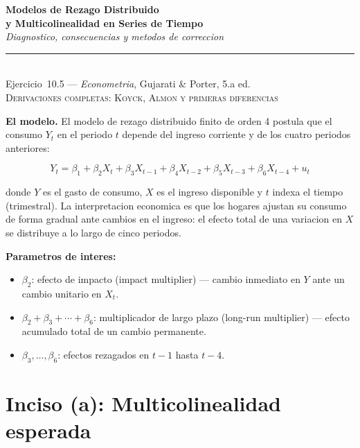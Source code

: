 \documentclass[12pt, letterpaper]{article}
\theoremstyle{remark}
\begin{document}
\begin{center}
  {\LARGE\bfseries Modelos de Rezago Distribuido}\\[6pt]
  {\LARGE\bfseries y Multicolinealidad en Series de Tiempo}\\[12pt]
  {\large\itshape Diagnostico, consecuencias y metodos de correccion}\\[14pt]
  \rule{0.55\linewidth}{0.6pt}\\[8pt]
  {\normalsize Ejercicio~10.5 --- \textit{Econometria}, Gujarati \& Porter, 5.a ed.}\\[4pt]
  {\small\textsc{Derivaciones completas: Koyck, Almon y primeras diferencias}}
\end{center}

\vspace{10pt}

\noindent\textbf{El modelo.}\quad
El modelo de rezago distribuido finito de orden 4 postula que el consumo
$Y_t$ en el periodo $t$ depende del ingreso corriente y de los cuatro periodos
anteriores:

\begin{equation}
  Y_t = \beta_1 + \beta_2 X_t + \beta_3 X_{t-1} + \beta_4 X_{t-2}
        + \beta_5 X_{t-3} + \beta_6 X_{t-4} + u_t
  \label{eq:modelo}
\end{equation}

\noindent donde $Y$ es el gasto de consumo, $X$ es el ingreso disponible y $t$
indexa el tiempo (trimestral). La interpretacion economica es que los hogares
ajustan su consumo de forma gradual ante cambios en el ingreso: el efecto total
de una variacion en $X$ se distribuye a lo largo de cinco periodos.

\medskip
\noindent\textbf{Parametros de interes:}
\begin{itemize}[leftmargin=1.6em, itemsep=3pt]
  \item $\beta_2$: efecto de impacto (impact multiplier) --- cambio inmediato en
    $Y$ ante un cambio unitario en $X_t$.
  \item $\beta_2 + \beta_3 + \cdots + \beta_6$: multiplicador de largo plazo
    (long-run multiplier) --- efecto acumulado total de un cambio permanente.
  \item $\beta_3, \ldots, \beta_6$: efectos rezagados en $t-1$ hasta $t-4$.
\end{itemize}

\section{Inciso (a): Multicolinealidad esperada}
\end{document}

